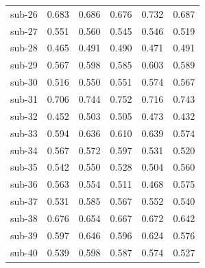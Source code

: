 \begin{table}[t]
\begin{tabular}{lccccc}
sub-26 & 0.683 & 0.686 & 0.676 & 0.732 & 0.687 \\
sub-27 & 0.551 & 0.560 & 0.545 & 0.546 & 0.519 \\
sub-28 & 0.465 & 0.491 & 0.490 & 0.471 & 0.491 \\
sub-29 & 0.567 & 0.598 & 0.585 & 0.603 & 0.589 \\
sub-30 & 0.516 & 0.550 & 0.551 & 0.574 & 0.567 \\
sub-31 & 0.706 & 0.744 & 0.752 & 0.716 & 0.743 \\
sub-32 & 0.452 & 0.503 & 0.505 & 0.473 & 0.432 \\
sub-33 & 0.594 & 0.636 & 0.610 & 0.639 & 0.574 \\
sub-34 & 0.567 & 0.572 & 0.597 & 0.531 & 0.520 \\
sub-35 & 0.542 & 0.550 & 0.528 & 0.504 & 0.560 \\
sub-36 & 0.563 & 0.554 & 0.511 & 0.468 & 0.575 \\
sub-37 & 0.531 & 0.585 & 0.567 & 0.552 & 0.540 \\
sub-38 & 0.676 & 0.654 & 0.667 & 0.672 & 0.642 \\
sub-39 & 0.597 & 0.646 & 0.596 & 0.624 & 0.576 \\
sub-40 & 0.539 & 0.598 & 0.587 & 0.574 & 0.527 \\
\bottomrule
\end{tabular}
\end{table}
